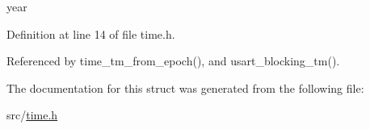 year 



Definition at line 14 of file time.\+h.



Referenced by time\+\_\+tm\+\_\+from\+\_\+epoch(), and usart\+\_\+blocking\+\_\+tm().



The documentation for this struct was generated from the following file\+:\begin{DoxyCompactItemize}
\item 
src/\hyperlink{time_8h}{time.\+h}\end{DoxyCompactItemize}
